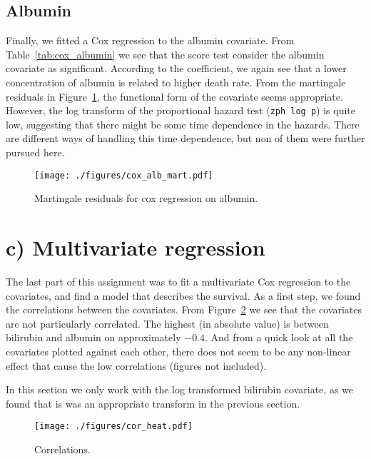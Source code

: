 \documentclass[11pt,a4paper]{article}
\begin{document}
\subsection{Albumin}

Finally, we fitted a Cox regression to the albumin covariate. From Table~\ref{tab:cox_albumin} we see that the score test consider the albumin covariate as significant.
According to the coefficient, we again see that a lower concentration of albumin is related to higher death rate.
From the martingale residuals in Figure~\ref{fig:cox_alb_mart}, the functional form of the covariate seems appropriate. 
However, the log transform of the proportional hazard test (\verb+zph log p+) is quite low, suggesting that there might be some time dependence in the hazards.
There are different ways of handling this time dependence, but non of them were further pursued here.



\begin{figure}[h!tb]
    \begin{center}
        \texttt{[image: ./figures/cox\_alb\_mart.pdf]}
    \end{center}
    \vspace{-0.2cm}
    \caption{Martingale residuals for cox regression on albumin.}
    \label{fig:cox_alb_mart}
\end{figure}



\section{c) Multivariate regression}

The last part of this assignment was to fit a multivariate Cox regression to the covariates, and find a model that describes the survival.
As a first step, we found the correlations between the covariates. From Figure~\ref{fig:cor_heat} we see that the covariates are not particularly correlated. The highest (in absolute value) is between bilirubin and albumin on approximately $-0.4$. And from a quick look at all the covariates plotted against each other, there does not seem to be any non-linear effect that cause the low correlations (figures not included).

In this section we only work with the log transformed bilirubin covariate, as we found that is was an appropriate transform in the previous section.
%
\begin{figure}[h!tb]
    \begin{center}
        \texttt{[image: ./figures/cor\_heat.pdf]}
    \end{center}
    \vspace{-0.8cm}
    \caption{Correlations.}
    \label{fig:cor_heat}
\end{figure}
\end{document}
